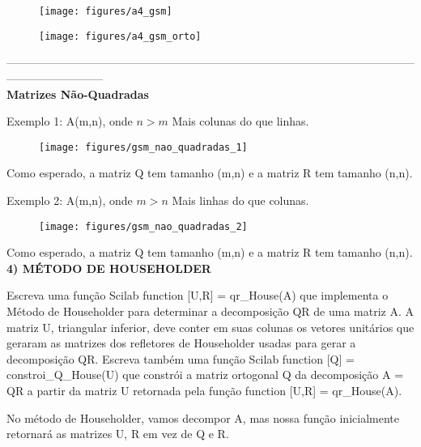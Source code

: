 \documentclass[leqno]{article}
\numberwithin{equation}{section}
\begin{document}
	\begin{figure}[H]
		\centering
		\texttt{[image: figures/a4\_gsm]}		
	\end{figure}
	
	\begin{figure}[H]
		\centering
		\texttt{[image: figures/a4\_gsm\_orto]}		
	\end{figure}

	--------------------------------------------------------------------------------------------------------------------------------------\\
	\newpage
	\noindent \textbf{{\large Matrizes Não-Quadradas}}
	
	Exemplo 1: A(m,n), onde $n > m$ Mais colunas do que linhas.
	
	\begin{figure}[H]
		\centering
		\texttt{[image: figures/gsm\_nao\_quadradas\_1]}		
	\end{figure}
	
	Como esperado, a matriz Q tem tamanho (m,n) e a matriz R tem tamanho (n,n).
	
	Exemplo 2: A(m,n), onde $m > n$ Mais linhas do que colunas.
	
	\begin{figure}[H]
		\centering
		\texttt{[image: figures/gsm\_nao\_quadradas\_2]}		
	\end{figure}
	
	Como esperado, a matriz Q tem tamanho (m,n) e a matriz R tem tamanho (n,n).
	\newpage
	\noindent \textbf{{\large	4) MÉTODO DE HOUSEHOLDER}}
	
	\begin{tcolorbox}[colback=green!5,colframe=green!40!black]
	Escreva uma função Scilab function [U,R] = qr\_House(A) que implementa o Método de Householder para determinar a decomposição QR de uma matriz A. A matriz U, triangular inferior, deve conter em suas colunas os vetores unitários que geraram as matrizes dos refletores de Householder usadas para gerar a decomposição QR.
	Escreva também uma função Scilab function [Q] = constroi\_Q\_House(U) que constrói a matriz ortogonal Q da decomposição A = QR a partir da matriz U retornada pela função function [U,R] = qr\_House(A).
	\end{tcolorbox}
		
	No método de Householder, vamos decompor A, mas nossa função inicialmente retornará as matrizes U, R em vez de Q e R.
	
\end{document}

